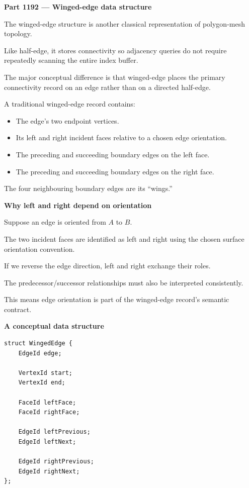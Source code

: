 \textbf{Part 1192 --- Winged-edge data structure}

The winged-edge structure is another classical representation of polygon-mesh topology.

Like half-edge, it stores connectivity so adjacency queries do not require repeatedly scanning the entire index buffer.

The major conceptual difference is that winged-edge places the primary connectivity record on an edge rather than on a directed half-edge.

A traditional winged-edge record contains:

\begin{itemize}
\tightlist
\item
  The edge's two endpoint vertices.
\item
  Its left and right incident faces relative to a chosen edge orientation.
\item
  The preceding and succeeding boundary edges on the left face.
\item
  The preceding and succeeding boundary edges on the right face.
\end{itemize}

The four neighbouring boundary edges are its ``wings.''

\textbf{Why left and right depend on orientation}

Suppose an edge is oriented from \(A\) to \(B\).

The two incident faces are identified as left and right using the chosen surface orientation convention.

If we reverse the edge direction, left and right exchange their roles.

The predecessor/successor relationships must also be interpreted consistently.

This means edge orientation is part of the winged-edge record's semantic contract.

\textbf{A conceptual data structure}

\begin{verbatim}
struct WingedEdge {
    EdgeId edge;

    VertexId start;
    VertexId end;

    FaceId leftFace;
    FaceId rightFace;

    EdgeId leftPrevious;
    EdgeId leftNext;

    EdgeId rightPrevious;
    EdgeId rightNext;
};
\end{verbatim}

